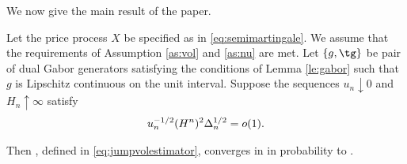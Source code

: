 We now give the main result of the paper.
\begin{prop} \label{pro:infinity}
  Let the price process  $X$ be specified as in  \eqref{eq:semimartingale}. We assume that the requirements of Assumption \ref{as:vol} and \ref{as:nu} are met. Let $\{g, \tg\}$ be pair of dual Gabor generators satisfying the conditions of Lemma \eqref{le:gabor} such that $g$ is Lipschitz continuous on the unit interval.
  Suppose the sequences $u_n \downarrow 0$ and $H_n \uparrow \infty$ satisfy 
  \begin{align}
    u_n^{-1/2}(H^n)^2\Delta_n^{1/2} = o(1).\notag
    \label{}
  \end{align} 
  \begin{comment}and   that $\nu$ satisfies 
   \begin{align}
    (x^2 \wedge u_n^{1/2}) \ast \nu_1 = o(H_n^{-2}).
    \label{eq:smallo}
  \end{align}
  \end{comment}
  Then  \jvn, defined in \eqref{eq:jumpvolestimator}, converges in \Ltwo in probability to \sv.
\end{prop}
